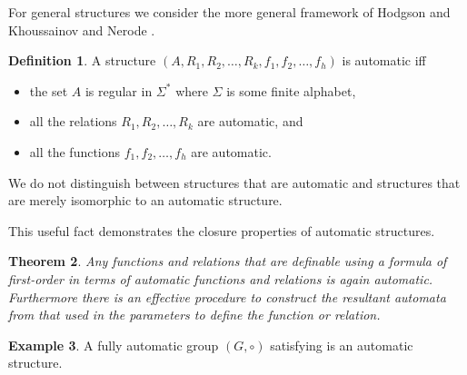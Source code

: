 \documentclass[british,a4paper,]{scrartcl}
\newtheorem{theorem}{Theorem}
\theoremstyle{definition}
\newtheorem{definition}[theorem]{Definition}
\newtheorem{example}[theorem]{Example}
\theoremstyle{remark}
\begin{document}
For general structures we consider the more general framework of
Hodgson \autocite{Ho76, Ho83} and Khoussainov and Nerode \autocite{KN}.

\begin{definition} \label{defn:automaticstructure}
    A structure \((A, R_1, R_2, \dots, R_k, f_1, f_2,\dots, f_h)\) is automatic iff
    \begin{itemize}
        \item the set \(A\) is regular in \(\Sigma^*\) where \(\Sigma\) is some finite alphabet,
        \item all the relations \(R_1, R_2, \dots, R_k\) are automatic, and
        \item all the functions \(f_1, f_2, \dots, f_h\) are automatic.
    \end{itemize}
    We do not distinguish between structures that are automatic and structures
    that are merely isomorphic to an automatic structure.
\end{definition}

This useful fact demonstrates the closure properties of automatic structures.
\begin{theorem}
    Any functions and relations that are definable
    using a formula of first-order in terms of automatic functions and relations is again automatic.
    Furthermore there is an effective procedure to construct the resultant automata
    from that used in the parameters to define the function or relation.
\end{theorem}

\begin{example}
    A fully automatic group \((G,\circ)\) satisfying  is an automatic structure.
\end{example}
\end{document}
